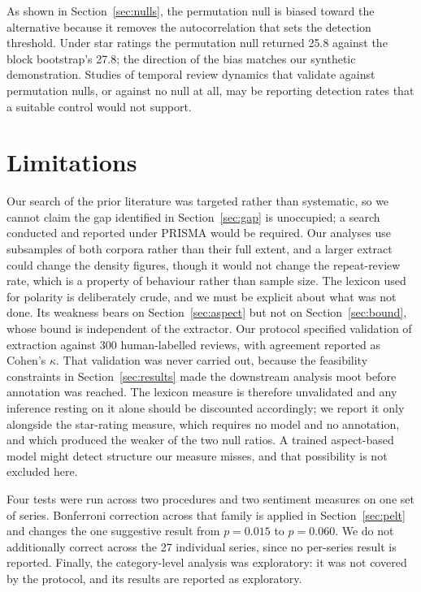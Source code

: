 \documentclass[11pt,a4paper]{article}
\makeatletter
\let\original@section\section
\renewcommand{\section}{\FloatBarrier\original@section}%
\makeatother
\begin{document}
As shown in Section~\ref{sec:nulls}, the permutation null is biased toward the
alternative because it removes the autocorrelation that sets the detection
threshold. Under star ratings the permutation null returned 25.8 against the
block bootstrap's 27.8; the direction of the bias matches our synthetic
demonstration. Studies of temporal review dynamics that validate against
permutation nulls, or against no null at all, may be reporting detection rates
that a suitable control would not support.

\section{Limitations}
\label{sec:limitations}

Our search of the prior literature was targeted rather than systematic, so we
cannot claim the gap identified in Section~\ref{sec:gap} is unoccupied; a search conducted and reported under PRISMA \citep{page2021, moher2009}
would be required. Our analyses use
subsamples of both corpora rather than their full extent, and a larger extract
could change the density figures, though it would not change the repeat-review
rate, which is a property of behaviour rather than sample size. The lexicon used for polarity is deliberately crude, and we must be explicit
about what was not done. Its weakness bears on
Section~\ref{sec:aspect} but not on Section~\ref{sec:bound}, whose bound is
independent of the extractor. Our protocol specified validation of extraction against 300
human-labelled reviews, with agreement reported as Cohen's $\kappa$. That
validation was never carried out, because the feasibility constraints in
Section~\ref{sec:results} made the downstream analysis moot before annotation
was reached. The lexicon measure is therefore unvalidated and any inference resting
on it alone should be discounted accordingly; we report it only alongside the
star-rating measure, which requires no model and no annotation, and which
produced the weaker of the two null ratios. A trained aspect-based model might
detect structure our measure misses, and that possibility is not excluded here.

Four tests were run across two procedures and two sentiment measures on one set
of series. Bonferroni correction across that family is applied in
Section~\ref{sec:pelt} and changes the one suggestive result from
$p = 0.015$ to $p = 0.060$. We do not additionally correct across the 27
individual series, since no per-series result is reported.
Finally, the category-level analysis was exploratory: it was not covered by the protocol, and its
results are reported as exploratory.
\end{document}
